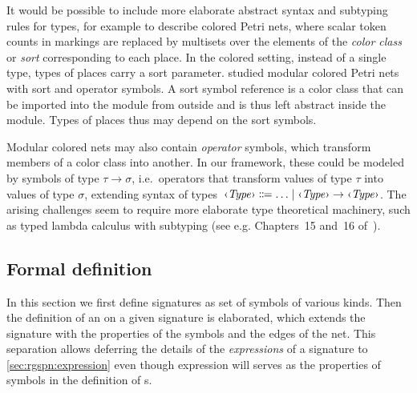 \begin{remark}\label{rem:rgspn:colored}
  It would be possible to include more elaborate abstract syntax and subtyping rules for types, for example to describe colored Petri nets, where scalar token counts in markings are replaced by multisets over the elements of the \emph{color class} or \emph{sort} corresponding to each place. In the colored setting, instead of a single  type, types of places carry a sort parameter. \citet{Kindler07modular} studied modular colored Petri nets with sort and operator symbols. A sort symbol reference is a color class that can be imported into the module from outside and is thus left abstract inside the module. Types of places thus may depend on the sort symbols.

  Modular colored nets may also contain \emph{operator} symbols, which transform members of a color class into another. In our framework, these could be modeled by symbols of type \(\tau \to \sigma\), i.e.~operators that transform values of type \(\tau\) into values of type \(\sigma\), extending syntax of types~\(\ebnfVar{Type} \ebnfEq \ldots \mid \ebnfVar{Type} \to \ebnfVar{Type}\). The arising challenges seem to require more elaborate type theoretical machinery, such as typed lambda calculus with subtyping (see e.g. Chapters~15 and~16 of~\cite{Pierce02tapl}).
\end{remark}

\subsection{Formal definition}

In this section we first define  signatures as set of symbols of various kinds. Then the definition of an  on a given signature is elaborated, which extends the signature with the properties of the symbols and the edges of the net. This separation allows deferring the details of the \emph{expressions} of a signature to \vref{sec:rgspn:expression} even though expression will serves as the properties of symbols in the definition of s.

